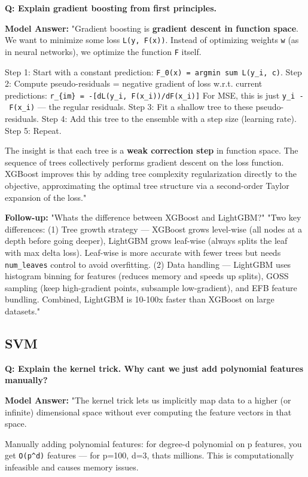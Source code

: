 \documentclass[11pt]{article}
\begin{document}
\textbf{Q: Explain gradient boosting from first principles.}

\textbf{Model Answer:}
"Gradient boosting is \textbf{gradient descent in function space}. We want to minimize some loss \texttt{L(y,\ F(x))}. Instead of optimizing weights \texttt{w} (as in neural networks), we optimize the function \texttt{F} itself.

Step 1: Start with a constant prediction: \texttt{F\_0(x)\ =\ argmin\ sum\ L(y\_i,\ c)}.
Step 2: Compute pseudo-residuals = negative gradient of loss w.r.t. current predictions:
\texttt{r\_\{im\}\ =\ -{[}dL(y\_i,\ F(x\_i))/dF(x\_i){]}}
For MSE, this is just \texttt{y\_i\ -\ F(x\_i)} --- the regular residuals.
Step 3: Fit a shallow tree to these pseudo-residuals.
Step 4: Add this tree to the ensemble with a step size (learning rate).
Step 5: Repeat.

The insight is that each tree is a \textbf{weak correction step} in function space. The sequence of trees collectively performs gradient descent on the loss function. XGBoost improves this by adding tree complexity regularization directly to the objective, approximating the optimal tree structure via a second-order Taylor expansion of the loss."

\textbf{Follow-up:} "What\textquotesingle s the difference between XGBoost and LightGBM?"
"Two key differences: (1) Tree growth strategy --- XGBoost grows level-wise (all nodes at a depth before going deeper), LightGBM grows leaf-wise (always splits the leaf with max delta loss). Leaf-wise is more accurate with fewer trees but needs \texttt{num\_leaves} control to avoid overfitting. (2) Data handling --- LightGBM uses histogram binning for features (reduces memory and speeds up splits), GOSS sampling (keep high-gradient points, subsample low-gradient), and EFB feature bundling. Combined, LightGBM is 10-100x faster than XGBoost on large datasets."

\subsection{SVM}\label{svm-1}

\textbf{Q: Explain the kernel trick. Why can\textquotesingle t we just add polynomial features manually?}

\textbf{Model Answer:}
"The kernel trick lets us implicitly map data to a higher (or infinite) dimensional space without ever computing the feature vectors in that space.

Manually adding polynomial features: for degree-d polynomial on p features, you get \texttt{O(p\^{}d)} features --- for p=100, d=3, that\textquotesingle s millions. This is computationally infeasible and causes memory issues.
\end{document}
